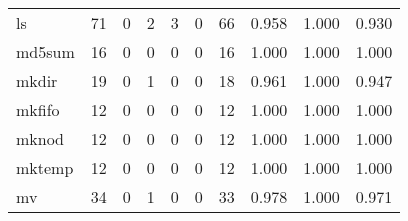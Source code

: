 \begin{longtable}{lp{2.0cm}p{2.0cm}p{2.0cm}p{2.0cm}p{2.0cm}p{2.0cm}p{2.0cm}p{2.0cm}p{2.0cm}}
ls        &                     71 &                                             0 &                                            2 &                                           3 &                                            0 &                                         66 &                                0.958 &                                  1.000 &                                0.930 \\
md5sum    &                     16 &                                             0 &                                            0 &                                           0 &                                            0 &                                         16 &                                1.000 &                                  1.000 &                                1.000 \\
mkdir     &                     19 &                                             0 &                                            1 &                                           0 &                                            0 &                                         18 &                                0.961 &                                  1.000 &                                0.947 \\
mkfifo    &                     12 &                                             0 &                                            0 &                                           0 &                                            0 &                                         12 &                                1.000 &                                  1.000 &                                1.000 \\
mknod     &                     12 &                                             0 &                                            0 &                                           0 &                                            0 &                                         12 &                                1.000 &                                  1.000 &                                1.000 \\
mktemp    &                     12 &                                             0 &                                            0 &                                           0 &                                            0 &                                         12 &                                1.000 &                                  1.000 &                                1.000 \\
mv        &                     34 &                                             0 &                                            1 &                                           0 &                                            0 &                                         33 &                                0.978 &                                  1.000 &                                0.971 \\

\end{longtable}
